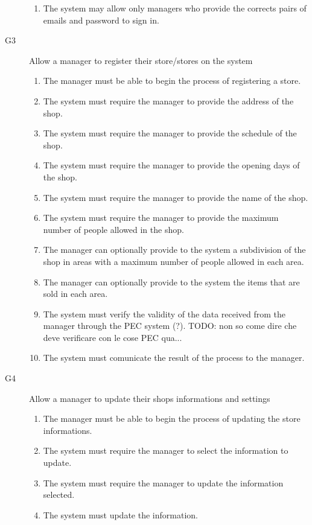 \begin{description}
\begin{enumerate}[resume*]
            \item The system may allow only managers who provide the corrects pairs of emails and password to sign in.
        \end{enumerate}
    \item [G3] Allow a manager to register their store/stores on the system
        \begin{enumerate}[resume*]
            \item The manager must be able to begin the process of registering a store.
            \item The system must require the manager to provide the address of the shop.
            \item The system must require the manager to provide the schedule of the shop.
            \item The system must require the manager to provide the opening days of the shop.
            \item The system must require the manager to provide the name of the shop.
            \item The system must require the manager to provide the maximum number of people allowed in the shop.
            \item The manager can optionally provide to the system a subdivision of the shop in areas with a maximum number of people allowed in each area.
            \item The manager can optionally provide to the system the items that are sold in each area.
            \item The system must verify the validity of the data received from the manager through the PEC system (?). TODO: non so come dire che deve verificare con le cose PEC qua...
            \item The system must comunicate the result of the process to the manager.
        \end{enumerate}
    \item [G4] Allow a manager to update their shops informations and settings
        \begin{enumerate}[resume*]
            \item The manager must be able to begin the process of updating the store informations.
            \item The system must require the manager to select the information to update.
            \item The system must require the manager to update the information selected.
            \item The system must update the information.

\end{enumerate}
\end{description}
